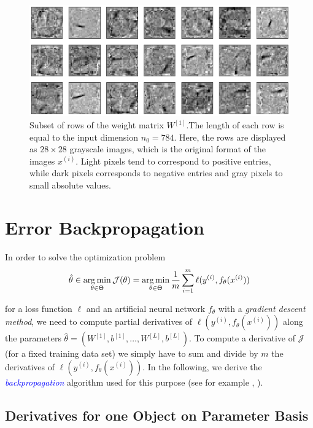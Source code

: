 \begin{figure}[h!]
    \centering
    \includegraphics[width=\textwidth]{images/figure9.png}
    \caption{
    Subset of rows of the weight matrix $W^{[1]}$.The length of each row is equal to the input dimension $n_0 = 784$. Here, the rows are displayed as $28 \times 28$ grayscale images, which is the original format of the images $x^{(i)}$. Light pixels tend to correspond to positive entries, while dark pixels corresponds to negative entries and gray pixels to small absolute values.
    }
    \label{fig:9}
\end{figure}

\section{Error Backpropagation}
In order to solve the optimization problem
\begin{equation}
    \hat{\theta} \in \operatorname*{arg\,min}_{\theta \in \Theta} \mathcal{J}(\theta) = \operatorname*{arg\,min}_{\theta \in \Theta} \frac{1}{m} \sum_{i=1}^{m} \ell(y^{(i)}, f_\theta(x^{(i)}))
    \label{eqn:48}
\end{equation}

for a loss function $\ell$ and an artificial neural network $f_{\theta}$ with a \emph{gradient descent method}, we need to compute partial derivatives of $\ell(y^{(i)}, f_\theta(x^{(i)}))$ along the parameters $\hat{\theta} = (W^{[1]}, b^{[1]}, \ldots, W^{[L]}, b^{[L]})$. To compute a derivative of $\mathcal{J}$ (for a fixed training data set) we simply have to sum and divide by $m$ the derivatives of $\ell(y^{(i)}, f_\theta(x^{(i)}))$. In the following, we derive the \textcolor{blue}{\emph{backpropagation}} algorithm used for this purpose (see for example \cite[section 6.5]{goodfellow2016deep}, \cite[section 5.3]{bishop2006pattern}).

\subsection{Derivatives for one Object on Parameter Basis}

